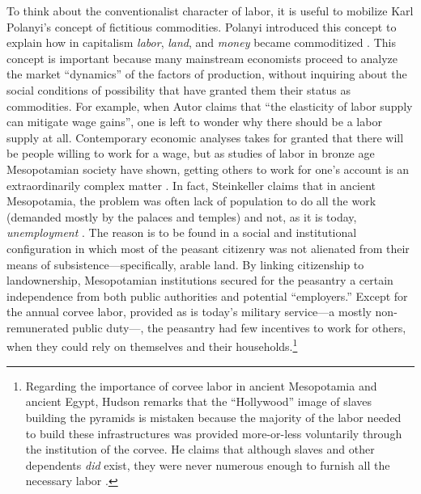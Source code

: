 \documentclass[version=last,draft=false,paper=A4,portrait,twoside=true,twocolumn=false,headinclude=false,footinclude=false,fontsize=12,BCOR=20mm,DIV=calc,pagesize=auto,titlepage=firstiscover,mpinclude=false,open=right,chapterprefix=true,numbers=autoendperiod,headsepline=false,headings=twolinechapter,parskip=false]{scrbook}
\begin{document}
To think about the conventionalist character of labor, it is useful to
 mobilize Karl Polanyi's concept of fictitious commodities. Polanyi
 introduced this concept to explain how in capitalism \emph{labor}, \emph{land}, and
 \emph{money} became commoditized \autocite{polanyi1944_2001}. This concept is
 important because many mainstream economists proceed to analyze the market
 ``dynamics'' of the factors of production, without inquiring about the
 social conditions of possibility that have granted them their status as
 commodities. For example, when Autor claims that ``the elasticity of labor
 supply can mitigate wage gains'', one is left to wonder why there should
 be a labor supply at all. Contemporary economic analyses takes for granted
 that there will be people willing to work for a wage, but as studies of
 labor in bronze age Mesopotamian society have shown, getting others to
 work for one's account is an extraordinarily complex matter
 \autocite[5]{steinkeller2015}. In fact, Steinkeller claims that in
 ancient Mesopotamia, the problem was often lack of population to do all
 the work (demanded mostly by the palaces and temples) and not, as it is
 today, \emph{unemployment} \autocite[9--19]{steinkeller2015}. The reason is to
 be found in a social and institutional configuration in which most of the
 peasant citizenry was not alienated from their means of
 subsistence---specifically, arable land. By linking citizenship to
 landownership, Mesopotamian institutions secured for the peasantry a
 certain independence from both public authorities and potential
 ``employers.'' Except for the annual corvee labor, provided as is today's
 military service---a mostly non-remunerated public duty---, the peasantry
 had few incentives to work for others, when they could rely on themselves
 and their households.\footnote{Regarding the importance of corvee labor in ancient Mesopotamia and
ancient Egypt, Hudson remarks that the ``Hollywood'' image of slaves
building the pyramids is mistaken because the majority of the labor needed
to build these infrastructures was provided more-or-less voluntarily
through the institution of the corvee. He claims that although slaves and
other dependents \emph{did} exist, they were never numerous enough to furnish all
the necessary labor \autocite[649]{hudson2015}.}
\end{document}
